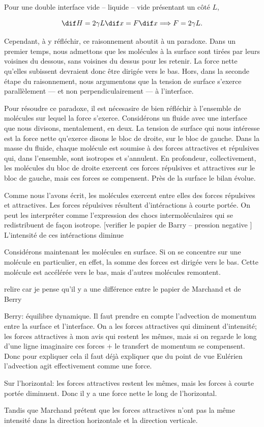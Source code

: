 Pour une double interface vide -- liquide -- vide présentant un côté $L$, 

\begin{displaymath}
  \dif H = 2 \gamma L \dif x = F \dif x \Longrightarrow  F = 2 \gamma L.
\end{displaymath}

Cependant, à y réfléchir, ce raisonnement aboutit à un paradoxe. Dans un premier temps, nous admettons que les molécules à la surface sont tirées par leurs voisines du dessous, sans voisines du dessus pour les retenir. La force nette qu'elles subissent devraient donc être dirigée vers le bas. Hors, dans la seconde étape du raisonnement, nous argumentons que la tension de surface s'exerce parallèlement --- et non perpendiculairement --- à l'interface. 

Pour résoudre ce paradoxe, il est nécesasire de bien réfléchir à l'ensemble de molécules sur lequel la force s'exerce. Considérons un fluide avec une interface que nous divisons, mentalement, en deux. La tension de surface qui nous intéresse est la force nette qu'exerce disons le bloc de droite, sur le bloc de gauche. Dans la masse du fluide, chaque molécule est soumise à des forces attractives et répulsives qui, dans l'ensemble, sont isotropes et s'annulent. En profondeur, collectivement, les molécules du bloc de droite exercent ces forces répulsives et attractives sur le bloc de gauche, mais ces forces se compensent. Près de la surface le bilan évolue. 

Comme nous l'avons écrit, les molécules exercent entre elles des forces répulsives et attractives. Les forces répulsives résultent d'intéractions à courte portée. On peut les interpréter comme l'expression des chocs intermoléculaires qui se redistribuent de façon isotrope. [verifier le papier de Barry -- pression negative ] L'intensité de ces intéractions diminue

Considérons maintenant les molécules en surface. Si on se concentre sur une molécule en particulier, en effet, la somme des forces est dirigée vers le bas. Cette molécule est accélérée vers le bas, mais d'autres molécules remontent. 

relire car je pense qu'il y a une différence entre le papier de Marchand et de Berry 

Berry: équilibre dynamique. Il faut prendre en compte l'advection de momentum entre la surface et l'interface. On a les forces attractives qui diminent d'intensité; les forces attractives à mon avis qui restent les mêmes, mais si on regarde le long d'une ligne imaginaire ces forces + le transfert de momentum se compensent. Donc pour expliquer cela il faut déjà expliquer que du point de vue Eulérien l'advection agit effectivement comme une force. 

Sur l'horizontal: les forces attractives restent les mêmes, mais les forces à courte portée diminuent. Donc il y a une force nette le long de l'horizontal. 

Tandis que Marchand prétent que les forces attractives n'ont pas la même intensité dans la direction horizontale et la direction verticale. 


